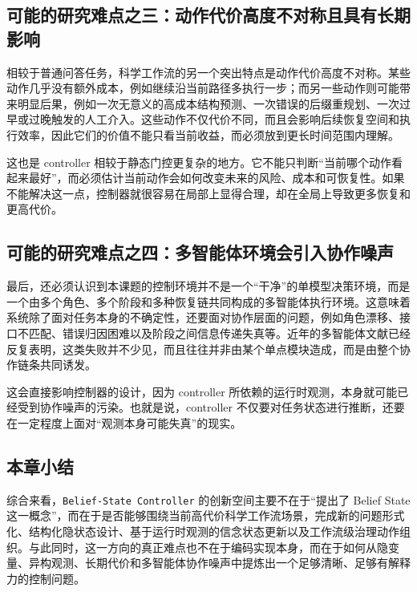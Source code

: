 \subsection{可能的研究难点之三：动作代价高度不对称且具有长期影响}

相较于普通问答任务，科学工作流的另一个突出特点是动作代价高度不对称。某些动作几乎没有额外成本，例如继续沿当前路径多执行一步；而另一些动作则可能带来明显后果，例如一次无意义的高成本结构预测、一次错误的后缀重规划、一次过早或过晚触发的人工介入。这些动作不仅代价不同，而且会影响后续恢复空间和执行效率，因此它们的价值不能只看当前收益，而必须放到更长时间范围内理解。

这也是 controller 相较于静态门控更复杂的地方。它不能只判断“当前哪个动作看起来最好”，而必须估计当前动作会如何改变未来的风险、成本和可恢复性。如果不能解决这一点，控制器就很容易在局部上显得合理，却在全局上导致更多恢复和更高代价。

\subsection{可能的研究难点之四：多智能体环境会引入协作噪声}

最后，还必须认识到本课题的控制环境并不是一个“干净”的单模型决策环境，而是一个由多个角色、多个阶段和多种恢复链共同构成的多智能体执行环境。这意味着系统除了面对任务本身的不确定性，还要面对协作层面的问题，例如角色漂移、接口不匹配、错误归因困难以及阶段之间信息传递失真等。近年的多智能体文献已经反复表明，这类失败并不少见，而且往往并非由某个单点模块造成，而是由整个协作链条共同诱发。

这会直接影响控制器的设计，因为 controller 所依赖的运行时观测，本身就可能已经受到协作噪声的污染。也就是说，controller 不仅要对任务状态进行推断，还要在一定程度上面对“观测本身可能失真”的现实。

\subsection{本章小结}

综合来看，\texttt{Belief-State Controller} 的创新空间主要不在于“提出了 Belief State 这一概念”，而在于是否能够围绕当前高代价科学工作流场景，完成新的问题形式化、结构化隐状态设计、基于运行时观测的信念状态更新以及工作流级治理动作组织。与此同时，这一方向的真正难点也不在于编码实现本身，而在于如何从隐变量、异构观测、长期代价和多智能体协作噪声中提炼出一个足够清晰、足够有解释力的控制问题。
